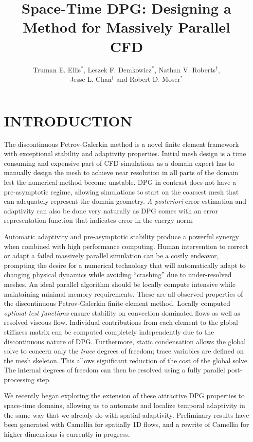 \documentclass{parcfd2014}
\title{Space-Time DPG: Designing a Method for Massively Parallel CFD}
\author{Truman E. Ellis$^{*}$, Leszek F. Demkowicz$^{*}$, Nathan V. Roberts$^{\dag}$,\\ Jesse L. Chan$^{\ddag}$ and Robert D. Moser$^{*}$}
\begin{document}

\section{INTRODUCTION}

The discontinuous Petrov-Galerkin method is a novel finite element framework with exceptional stability and adaptivity properties.
Initial mesh design is a time consuming and expensive part of CFD simulations as a domain expert has to manually design the 
mesh to achieve near resolution in all parts of the domain lest the numerical method become unstable.
DPG in contrast does not have a pre-asymptotic regime, allowing simulations to start on the coarsest mesh that can adequately represent the domain geometry.
\emph{A posteriori} error estimation and adaptivity can also be done very naturally as DPG comes with an error representation function 
that indicates error in the energy norm.

Automatic adaptivity and pre-asymptotic stability produce a powerful synergy when combined with high performance computing.
Human intervention to correct or adapt a failed massively parallel simulation can be a costly endeavor, prompting the desire for a
numerical technology that will automatically adapt to changing physical dynamics while avoiding ``crashing'' due to under-resolved meshes.
An ideal parallel algorithm should be locally compute intensive while maintaining minimal memory requirements.
These are all observed properties of the discontinuous Petrov-Galerkin finite element method.
Locally computed \emph{optimal test functions} ensure stability on convection dominated flows as well as resolved viscous flow.
Individual contributions from each element to the global stiffness matrix can be computed completely independently due to the discontinuous nature of DPG.
Furthermore, static condensation allows the global solve to concern only the \emph{trace} degrees of freedom; 
trace variables are defined on the mesh skeleton.  
This allows significant reduction of the cost of the global solve.  
The internal degrees of freedom can then be resolved using a fully parallel post-processing step.

We recently began exploring the extension of these attractive DPG properties to space-time domains, allowing us to automate and localize temporal adaptivity
in the same way that we already do with spatial adaptivity. Preliminary results have been generated with Camellia\cite{Roberts2011} for spatially 1D flows,
and a rewrite of Camellia for higher dimensions is currently in progress.
\end{document}
